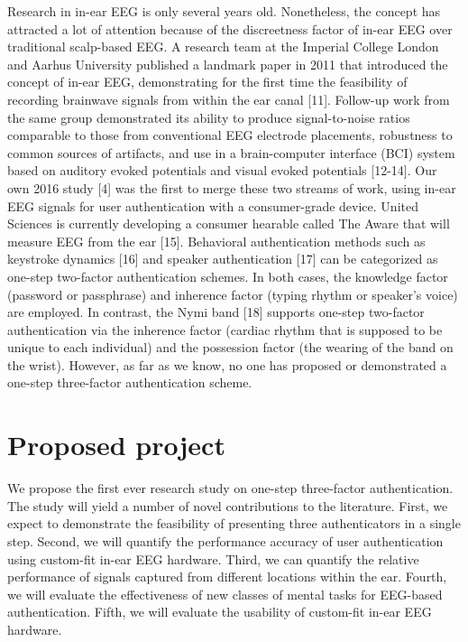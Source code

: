 \documentclass[11pt]{article}
\begin{document}
Research in in-ear EEG is only several years old. Nonetheless, the concept has
attracted a lot of attention because of the discreetness factor of in-ear EEG over
traditional scalp-based EEG. A research team at the Imperial College London
and Aarhus University published a landmark paper in 2011 that introduced the
concept of in-ear EEG, demonstrating for the first time the feasibility of recording
brainwave signals from within the ear canal [11]. Follow-up work from the same
group demonstrated its ability to produce signal-to-noise ratios comparable to
those from conventional EEG electrode placements, robustness to common
sources of artifacts, and use in a brain-computer interface (BCI) system based on
auditory evoked potentials and visual evoked potentials [12-14]. Our own 2016 study
[4] was the first to merge these two streams of work, using in-ear EEG signals for
user authentication with a consumer-grade device. United Sciences is currently
developing a consumer hearable called The Aware that will measure EEG from the ear [15].
Behavioral authentication methods such as keystroke dynamics [16] and speaker
authentication [17] can be categorized as one-step two-factor authentication
schemes. In both cases, the knowledge factor (password or passphrase) and
inherence factor (typing rhythm or speaker’s voice) are employed. In contrast, the
Nymi band [18] supports one-step two-factor authentication via the inherence
factor (cardiac rhythm that is supposed to be unique to each individual) and the
possession factor (the wearing of the band on the wrist). However, as far as we
know, no one has proposed or demonstrated a one-step three-factor
authentication scheme.

\section{Proposed project}
\label{sec:orgb73667f}

We propose the first ever research study on one-step three-factor authentication.
The study will yield a number of novel contributions to the literature. First, we
expect to demonstrate the feasibility of presenting three authenticators in a single
step. Second, we will quantify the performance accuracy of user authentication
using custom-fit in-ear EEG hardware. Third, we can quantify the relative
performance of signals captured from different locations within the ear. Fourth,
we will evaluate the effectiveness of new classes of mental tasks for EEG-based
authentication. Fifth, we will evaluate the usability of custom-fit in-ear EEG
hardware.
\end{document}
